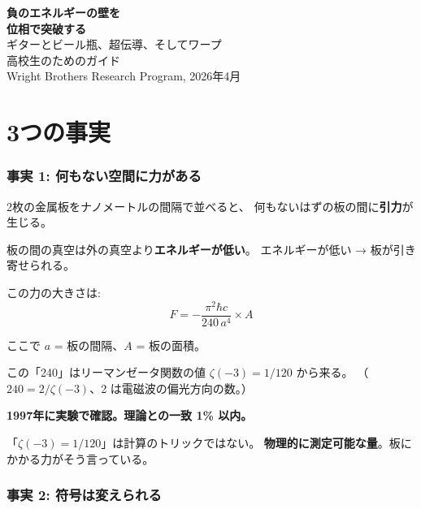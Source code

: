 \documentclass[12pt,a4paper]{article}
\begin{document}
\begin{center}
{\Huge\bfseries 負のエネルギーの壁を}\\[0.2cm]
{\Huge\bfseries 位相で突破する}\\[0.8cm]
{\Large ギターとビール瓶、超伝導、そしてワープ}\\[1cm]
{\large 高校生のためのガイド}\\[0.5cm]
{\large Wright Brothers Research Program, 2026年4月}
\end{center}

\vspace{0.5cm}
\tableofcontents
\newpage

\part{3つの事実}

\section{事実 1: 何もない空間に力がある}

\begin{storybox}[カシミール効果]
2枚の金属板をナノメートルの間隔で並べると、
何もないはずの板の間に\textbf{引力}が生じる。

板の間の真空は外の真空より\textbf{エネルギーが低い}。
エネルギーが低い → 板が引き寄せられる。

この力の大きさは:
$$F = -\frac{\pi^2 \hbar c}{240 \, a^4} \times A$$

ここで $a$ = 板の間隔、$A$ = 板の面積。

この「240」はリーマンゼータ関数の値 $\zeta(-3) = 1/120$ から来る。
（$240 = 2/\zeta(-3)$、2 は電磁波の偏光方向の数。）

\textbf{1997年に実験で確認。理論との一致 1\% 以内。}
\end{storybox}

\begin{resultbox}[意味]
「$\zeta(-3) = 1/120$」は計算のトリックではない。
\textbf{物理的に測定可能な量}。板にかかる力がそう言っている。
\end{resultbox}

\section{事実 2: 符号は変えられる}
\end{document}
